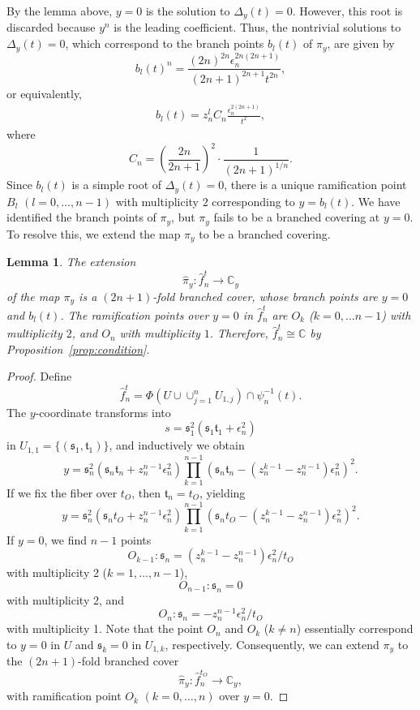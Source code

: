 \documentclass[10pt,a4paper,reqno]{amsart}
\newtheorem{lem}[thm]{Lemma}
\theoremstyle{definition}
\numberwithin{equation}{section}
\numberwithin{figure}{section}
\newcommand{\C}{\mathbb{C}}
\newcommand{\ep}{\epsilon}
\newcommand{\arrowr}{\rightarrow}
\begin{document}
By the lemma above, $y=0$ is the solution to $\Delta_y(t)=0$. However, this root is discarded because $y^n$ is the leading coefficient.
Thus, the nontrivial solutions to $\Delta_y(t)=0$, which correspond to the branch points $b_l(t)$ of $\pi_y$, are given by
\[b_l(t)^n=\frac{(2n)^{2n} {\ep_n^{2n(2n+1)}}}{(2n+1)^{2n+1} t^{2n}},\]
or equivalently,
\begin{align}
b_l(t)=z_n^l C_n \frac{{\ep_n^{2(2n+1)}}}{t^2},
\end{align}
where \[C_n=\left(\frac{2n}{2n+1}\right)^2 \cdot \frac{1}{(2n+1)^{1/n}}.\]
Since $b_l(t)$ is a simple root of $\Delta_y(t)=0$, 
there is a unique ramification point $B_l$ $(l=0,\dots, n-1)$ with multiplicity $2$ corresponding to $y=b_l(t)$.
We have identified the branch points of $\pi_y$, but $\pi_y$ fails to be a branched covering at $y=0$.
To resolve this, we extend the map $\pi_y$ to be a branched covering.

\begin{lem}
The extension \[\hat{\pi}_y: \hat{f}_n^t \arrowr \C_y\] 
of the map $\pi_y$ is a $(2n+1)$-fold branched cover, whose branch points are $y=0$ and $b_l(t)$.
The ramification points over $y=0$ in $\hat{f}_n^t$ are $O_{k}$ ($k=0,\dots n-1$) with multiplicity $2$, and $O_n$ with multiplicity $1$. 
Therefore, $\hat{f}_n^t \cong \C$ by Proposition~\ref{prop:condition}.
\end{lem}
\begin{proof}
Define \[\hat{f}_n^t =\Phi(U\cup \cup_{j=1}^n U_{1,j})\cap \psi_n^{-1}(t).\]
The $y$-coordinate transforms into \[s=\mathfrak{s}_1^2(\mathfrak{s}_1\mathfrak{t}_1+{\ep_n^{2}})\] in $U_{1,1}=\{(\mathfrak{s}_1, \mathfrak{t}_1)\}$,
and inductively we obtain 
\[y=\mathfrak{s}_n^2 (\mathfrak{s}_n \mathfrak{t}_n +z_n^{n-1}{\ep_n^{2}}) \prod_{k=1}^{n-1} (\mathfrak{s}_n \mathfrak{t}_n -(z_n^{k-1}-z_n^{n-1}){\ep_n^{2}})^2.  \]
If we fix the fiber over $t_O$, then $\mathfrak{t}_n=t_O$, yielding
\[y=\mathfrak{s}_n^2 (\mathfrak{s}_n t_O +z_n^{n-1}{\ep_n^{2}}) \prod_{k=1}^{n-1} (\mathfrak{s}_n t_O -(z_n^{k-1}-z_n^{n-1}){\ep_n^{2}})^2. \]
If $y=0$, we find $n-1$ points \[O_{k-1}: \mathfrak{s}_n=(z_n^{k-1}-z_n^{n-1}){\ep_n^{2}}/t_O\] with multiplicity 2 ($k=1,\dots, n-1$),
\[O_{n-1}: \mathfrak{s}_n=0\] with multiplicity 2, 
and \[O_n: \mathfrak{s}_n=- z_n^{n-1} {\ep_n^{2}}/t_O\] with multiplicity 1. 
Note that the point $ O_n$ and $O_k$ ($k\neq n$) essentially correspond to $y=0$ in $U$ and $\mathfrak{s}_k=0$ in $U_{1,k}$, respectively.
Consequently, we can extend $\pi_y $ to the $(2n+1)$-fold branched cover \[\hat{\pi}_y: \hat{f}_n^{t_O} \arrowr \C_y,\] 
with ramification point $O_k$ $(k=0,\dots, n)$ over $y=0$.  
\end{proof}
\end{document}
